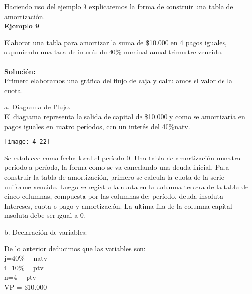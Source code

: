 {Haciendo uso del ejemplo 9 explicaremos la forma de construir una tabla de amortización.\\

\textbf{Ejemplo 9}

\vspace{5mm}

Elaborar una tabla para amortizar la suma de \$10.000 en 4 pagos iguales, suponiendo una tasa de interés de 40\% nominal anual trimestre vencido.
\\\\
\textbf{Solución:}
\\
Primero elaboramos una gráfica del flujo de caja y calculamos el valor de la cuota.
\\

\vspace{5mm}

a. Diagrama de Flujo: \\

El diagrama representa la salida de capital de \$10.000 y como se amortizaría en pagos iguales en cuatro períodos, con un interés del 40\%natv.

\begin{center}
	\texttt{[image: 4\_22]}\\
\end{center}

Se establece como fecha local el período 0.
Una tabla de amortización muestra período a período, la forma como se va cancelando una deuda inicial. Para construir la tabla de amortización, primero se calcula la cuota de la serie uniforme vencida. Luego se registra la cuota en la columna tercera de la tabla de cinco columnas, compuesta por las columnas de: período, deuda  insoluta, Intereses, cuota o pago y  amortización. La ultima fila de la columna capital insoluta debe ser igual a 0.

\vspace{5mm}

b. Declaración de variables:

\vspace{5mm}

De lo anterior deducimos que las variables son:\\

	j=40\% \ \ natv \\ 
	i=10\% \ \ ptv\\
	n=4 \ \ ptv \\
	VP = \$10.000

\vspace{5mm}

}
